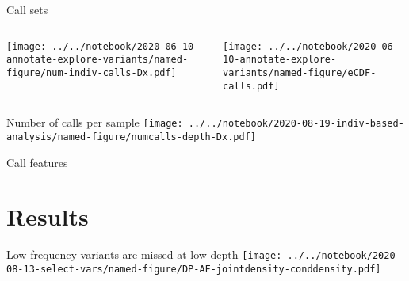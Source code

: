 \documentclass{beamer}
\begin{document}
\begin{frame}{Call sets}
\begin{columns}[t]
\begin{column}{0.7\textwidth}

\texttt{[image: ../../notebook/2020-06-10-annotate-explore-variants/named-figure/num-indiv-calls-Dx.pdf]}
\end{column}

\begin{column}{0.5\textwidth}

\texttt{[image: ../../notebook/2020-06-10-annotate-explore-variants/named-figure/eCDF-calls.pdf]}
\end{column}
\end{columns}
\end{frame}

\begin{frame}[label=numcalls-depth]{Number of calls per sample}
\texttt{[image: ../../notebook/2020-08-19-indiv-based-analysis/named-figure/numcalls-depth-Dx.pdf]}
\end{frame}

\begin{frame}{Call features}

\end{frame}

\section{Results}


\begin{frame}{Low frequency variants are missed at low depth}
\texttt{[image: ../../notebook/2020-08-13-select-vars/named-figure/DP-AF-jointdensity-conddensity.pdf]}
\end{frame}

\begin{columns}[t]
\begin{column}{0.5\textwidth}

\end{column}

\begin{column}{0.5\textwidth}

\end{column}
\end{columns}
\end{document}
